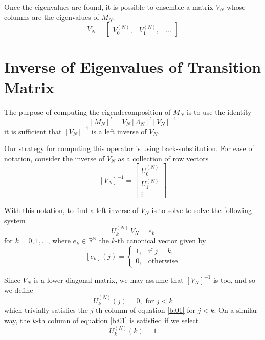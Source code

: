 \documentclass{article}
\newcommand{\N}{\mathbb{N}}
\newcommand{\R}{\mathbb{R}}
\newcommand{\spar}[1]{\left[ #1 \right]}
\begin{document}
Once the eigenvalues are found, it is possible to ensemble a matrix $V_N$ whose columns are the eigenvalues of $M_N$.
\begin{equation}
    V_N = \begin{bmatrix}
        V_0^{(N)}, & V_1^{(N)}, & \dots
    \end{bmatrix}
\end{equation}

\section{Inverse of Eigenvalues of Transition Matrix}
\label{ap:inverse}

The purpose of computing the eigendecomposition of $M_N$ is to use the identity
\begin{equation}
    \spar{M_N}^t = V_N \spar{\Lambda_N}^t \spar{V_N}^{-1}
\end{equation}
it is sufficient that $\spar{V_N}^{-1}$ is a left inverse of $V_N$. 

Our strategy for computing this operator is using back-substitution.
%
For ease of notation, consider the inverse of $V_N$ as a collection of row vectors
\begin{equation}
    \spar{V_N}^{-1} = \begin{bmatrix}
        U_0^{(N)} \\ U_1^{(N)} \\ \vdots
    \end{bmatrix}
    \label{b:00}
\end{equation} 

With this notation, to find a left inverse of $V_N$ is to solve to solve the following system
\begin{equation}
    U_k^{(N)}\, V_N = e_k
    \label{b:01}
\end{equation}
for $k = 0, 1, \dots$, where $e_k\in \R^\N$ the $k$-th canonical vector given by
\begin{equation}
    \spar{e_k}(j) = \begin{cases}
        1, &\text{if } j=k, \\
        0, &\text{otherwise}
    \end{cases}
\end{equation}

Since $V_N$ is a lower diagonal matrix, we may assume that $\spar{V_N}^{-1}$ is too, and so we define 
\begin{equation}
    {U_k^{(N)}}(j) = 0, \text{ for } j<k
\end{equation}
which trivially satisfies the $j$-th column of equation \eqref{b:01} for $j<k$.
%
On a similar way, the $k$-th column of equation \eqref{b:01} is satisfied if we select
\begin{equation}
    {U_k^{(N)}}(k) = 1
\end{equation}
\end{document}
